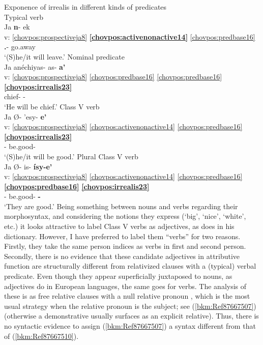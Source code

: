 \documentclass[output=paper]{langscibook}
\begin{document}
\ea\label{bkm:Ref87562993}Exponence of irrealis in different kinds of predicates \\ 
    \ea  Typical verb\\ {
    \glll {} Ja \textbf{n}{}- ek \\ 
    v: \ref{chovpos:prospectiveja8} \textbf{\ref{chovpos:activenonactive14}} \ref{chovpos:predbase16}\\ 
    {} \Prosp{} \textbf{\Third.\Irr{}}- go.away\\ 
    \glt `(S)he/it will leave.'
    }
    \ex\label{bkm:Ref87668503}Nominal predicate \\ {
    \glll  {} Ja anéchiyas- as- \textbf{a'}\\ 
    v: \ref{chovpos:prospectiveja8} \ref{chovpos:predbase16} \ref{chovpos:predbase16} \textbf{\ref{chovpos:irrealis23}}\\ 
    {} \Prosp{} chief- \Pl{}- \textbf{\Irr{}}\\ 
    \glt \textsc{`}He will be chief.'
    }
    \ex  Class V verb\\ {
    \glll {} Ja Ø- 'esy- \textbf{e'}\\ 
    v: \ref{chovpos:prospectiveja8} \ref{chovpos:activenonactive14} \ref{chovpos:predbase16} \textbf{\ref{chovpos:irrealis23}}\\ 
    {} \Prosp{} \Third{}- be.good- \textbf{\Irr{}}\\
    \glt `(S)he/it will be good.'
    }
    \ex  Plural Class V verb\\ {
    \glll {} Ja Ø- is- \textbf{ísy-}\textbf{e'}\\
    v: \ref{chovpos:prospectiveja8} \ref{chovpos:activenonactive14} \ref{chovpos:predbase16} \textbf{\ref{chovpos:predbase16}} \textbf{\ref{chovpos:irrealis23}}\\ 
    {} \textbf{\Prosp{}} \Third{}- be.good- \textbf{\Pl{}- \Irr{}}\\
    \glt `They are good.'
    }
    \z
\z 
Being something between nouns and verbs regarding their morphosyntax, and considering the notions they express (`big', `nice', `white', etc.) it looks attractive to label Class V verbs as adjectives, as \citet{Drayson2009} does in his dictionary. However, I have preferred to label them ``verbs'' for two reasons. Firstly, they take the same person indices as verbs in first and second person. Secondly, there is no evidence that these candidate adjectives in attributive function are structurally different from relativized clauses with a (typical) verbal predicate. Even though they appear superficially juxtaposed to nouns, as adjectives do in European languages, the same goes for verbs. The analysis of these is as free relative clauses with a null relative pronoun \citep{Carol2014}, which is the most usual strategy when the relative pronoun is the subject; see (\ref{bkm:Ref87667507}) (otherwise a demonstrative usually surfaces as an explicit relative). Thus, there is no syntactic evidence to assign (\ref{bkm:Ref87667507}) a syntax different from that of (\ref{bkm:Ref87667510}).
\end{document}
